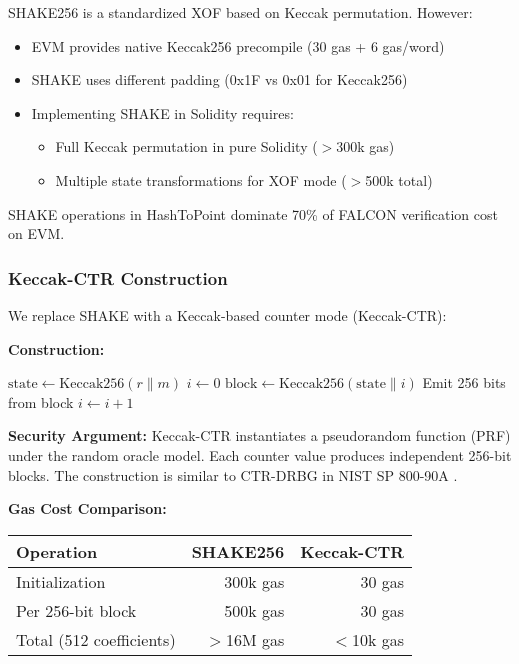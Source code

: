 \documentclass[11pt,a4paper]{article}
\begin{document}
SHAKE256 is a standardized XOF based on Keccak permutation. However:
\begin{itemize}
    \item EVM provides native Keccak256 precompile (30 gas + 6 gas/word)
    \item SHAKE uses different padding (0x1F vs 0x01 for Keccak256)
    \item Implementing SHAKE in Solidity requires:
    \begin{itemize}
        \item Full Keccak permutation in pure Solidity ($>$300k gas)
        \item Multiple state transformations for XOF mode ($>$500k total)
    \end{itemize}
\end{itemize}

SHAKE operations in HashToPoint dominate 70\% of FALCON verification cost on EVM.

\subsubsection{Keccak-CTR Construction}

We replace SHAKE with a Keccak-based counter mode (Keccak-CTR):

\textbf{Construction:}
\begin{algorithmic}[1]
\STATE $\text{state} \gets \text{Keccak256}(r \| m)$
\STATE $i \gets 0$
    \STATE $\text{block} \gets \text{Keccak256}(\text{state} \| i)$
    \STATE Emit 256 bits from block
    \STATE $i \gets i + 1$
\ENDWHILE
\end{algorithmic}

\textbf{Security Argument:} Keccak-CTR instantiates a pseudorandom function (PRF) under the random oracle model. Each counter value produces independent 256-bit blocks. The construction is similar to CTR-DRBG in NIST SP 800-90A \cite{nist800-90a}.

\textbf{Gas Cost Comparison:}
\begin{center}
\begin{tabular}{lrr}
\hline
\textbf{Operation} & \textbf{SHAKE256} & \textbf{Keccak-CTR} \\
\hline
Initialization & 300k gas & 30 gas \\
Per 256-bit block & 500k gas & 30 gas \\
Total (512 coefficients) & $>$16M gas & $<$10k gas \\
\hline
\end{tabular}
\end{center}
\end{document}
